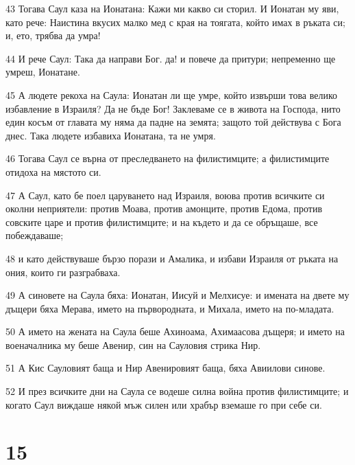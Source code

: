 \par 43 Тогава Саул каза на Ионатана: Кажи ми какво си сторил. И Ионатан му яви, като рече: Наистина вкусих малко мед с края на тоягата, който имах в ръката си; и, ето, трябва да умра!
\par 44 И рече Саул: Така да направи Бог. да! и повече да притури; непременно ще умреш, Ионатане.
\par 45 А людете рекоха на Саула: Ионатан ли ще умре, който извърши това велико избавление в Израиля? Да не бъде Бог! Заклеваме се в живота на Господа, нито един косъм от главата му няма да падне на земята; защото той действува с Бога днес. Така людете избавиха Ионатана, та не умря.
\par 46 Тогава Саул се върна от преследването на филистимците; а филистимците отидоха на мястото си.
\par 47 А Саул, като бе поел царуването над Израиля, воюва против всичките си околни неприятели: против Моава, против амонците, против Едома, против совските царе и против филистимците; и на където и да се обръщаше, все побеждаваше;
\par 48 и като действуваше бързо порази и Амалика, и избави Израиля от ръката на ония, които ги разграбваха.
\par 49 А синовете на Саула бяха: Ионатан, Иисуй и Мелхисуе: и имената на двете му дъщери бяха Мерава, името на първородната, и Михала, името на по-младата.
\par 50 А името на жената на Саула беше Ахиноама, Ахимаасова дъщеря; и името на военачалника му беше Авенир, син на Сауловия стрика Нир.
\par 51 А Кис Сауловият баща и Нир Авенировият баща, бяха Авиилови синове.
\par 52 И през всичките дни на Саула се водеше силна война против филистимците; и когато Саул виждаше някой мъж силен или храбър вземаше го при себе си.

\chapter{15}

